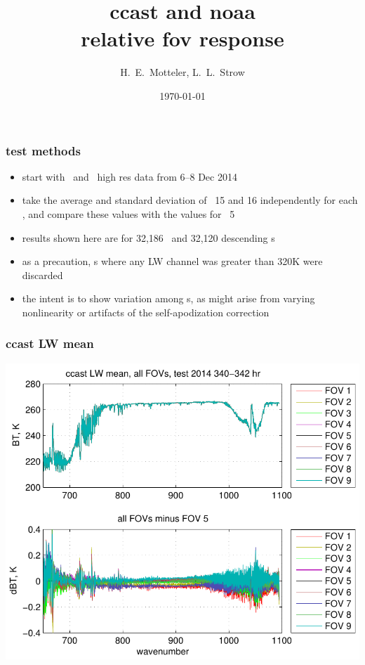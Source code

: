 \documentclass[11pt]{beamer}
\title{ccast and noaa \\
  relative fov response}
\author{H.~E.~Motteler, L.~L.~Strow}
\institute{
  UMBC Atmospheric Spectroscopy Lab \\
  Joint Center for Earth Systems Technology \\
}
\date{\today}
\begin{document}
\begin{frame}[plain]
\titlepage
\end{frame}
\begin{frame}
\frametitle{test methods}

\begin{itemize}

  \item start with \ccast\ and \noaa\ high res data from 6--8 Dec 2014

  \item take the average and standard deviation of \for\ 15 and 16
    independently for each \fov, and compare these values with the
    values for \fov\ 5

  \item results shown here are for 32,186 \ccast\ and 32,120 {\noaa}
    descending {\for}s

  \item as a precaution, {\for}s where any LW channel was greater than
    320K were discarded

  \item the intent is to show variation among {\fov}s, as might arise
    from varying nonlinearity or artifacts of the self-apodization
    correction

\end{itemize}

\end{frame}
\begin{frame}
\frametitle{ccast LW mean}

\begin{center}
  \includegraphics[scale=0.7]{figures/ccast_LW_avg_2014_340-342_hr.pdf}
\end{center}

\end{frame}
\end{document}
